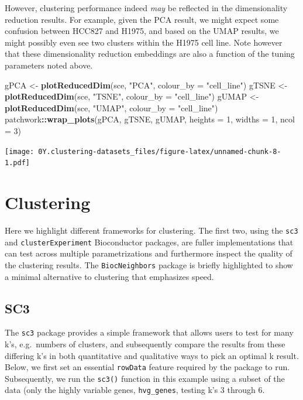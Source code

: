 \documentclass[]{book}
\newenvironment{Shaded}{\begin{snugshade}}{\end{snugshade}}
\newcommand{\DataTypeTok}[1]{\textcolor[rgb]{0.13,0.29,0.53}{#1}}
\newcommand{\DecValTok}[1]{\textcolor[rgb]{0.00,0.00,0.81}{#1}}
\newcommand{\KeywordTok}[1]{\textcolor[rgb]{0.13,0.29,0.53}{\textbf{#1}}}
\newcommand{\NormalTok}[1]{#1}
\newcommand{\OperatorTok}[1]{\textcolor[rgb]{0.81,0.36,0.00}{\textbf{#1}}}
\newcommand{\StringTok}[1]{\textcolor[rgb]{0.31,0.60,0.02}{#1}}
\begin{document}
However, clustering performance indeed \emph{may} be reflected in the dimensionality reduction results. For example, given the PCA result, we might expect some confusion between HCC827 and H1975, and based on the UMAP results, we might possibly even see two clusters within the H1975 cell line. Note however that these dimensionality reduction embeddings are also a function of the tuning parameters noted above.

\begin{Shaded}
\begin{Highlighting}[]
\NormalTok{gPCA <-}\StringTok{ }\KeywordTok{plotReducedDim}\NormalTok{(sce, }\StringTok{"PCA"}\NormalTok{, }\DataTypeTok{colour_by =} \StringTok{"cell_line"}\NormalTok{)}
\NormalTok{gTSNE <-}\StringTok{ }\KeywordTok{plotReducedDim}\NormalTok{(sce, }\StringTok{"TSNE"}\NormalTok{, }\DataTypeTok{colour_by =} \StringTok{"cell_line"}\NormalTok{)}
\NormalTok{gUMAP <-}\StringTok{ }\KeywordTok{plotReducedDim}\NormalTok{(sce, }\StringTok{"UMAP"}\NormalTok{, }\DataTypeTok{colour_by =} \StringTok{"cell_line"}\NormalTok{)}
\NormalTok{patchwork}\OperatorTok{::}\KeywordTok{wrap_plots}\NormalTok{(gPCA, gTSNE, gUMAP, }\DataTypeTok{heights =} \DecValTok{1}\NormalTok{, }\DataTypeTok{widths =} \DecValTok{1}\NormalTok{, }\DataTypeTok{ncol =} \DecValTok{3}\NormalTok{)}
\end{Highlighting}
\end{Shaded}

\texttt{[image: 0Y.clustering-datasets\_files/figure-latex/unnamed-chunk-8-1.pdf]}

\hypertarget{clustering}{%
\section{Clustering}\label{clustering}}

Here we highlight different frameworks for clustering. The first two, using the \texttt{sc3} and \texttt{clusterExperiment} Bioconductor packages, are fuller implementations that can test across multiple parametrizations and furthermore inspect the quality of the clustering results. The \texttt{BiocNeighbors} package is briefly highlighted to show a minimal alternative to clustering that emphasizes speed.

\hypertarget{sc3}{%
\subsection{SC3}\label{sc3}}

The \texttt{sc3} package provides a simple framework that allows users to test for many k's, e.g.~numbers of clusters, and subsequently compare the results from these differing k's in both quantitative and qualitative ways to pick an optimal k result. Below, we first set an essential \texttt{rowData} feature required by the package to run. Subsequently, we run the \texttt{sc3()} function in this example using a subset of the data (only the highly variable genes, \texttt{hvg\_genes}, testing k's 3 through 6.
\end{document}
